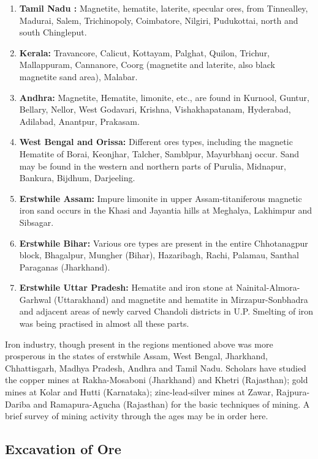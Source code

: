 \begin{enumerate}
\item {\bf Tamil Nadu :} Magnetite, hematite, laterite, specular ores, from Tinnealley, Madurai, Salem, Trichinopoly, Coimbatore, Nilgiri, Pudukottai, north and south Chingleput.
\item {\bf Kerala:} Travancore, Calicut, Kottayam, Palghat, Quilon, Trichur, Mallappuram, Cannanore, Coorg (magnetite and laterite, also black magnetite sand area), Malabar.
\item {\bf Andhra:} Magnetite, Hematite, limonite, etc., are found in Kurnool, Guntur, Bellary, Nellor, West Godavari, Krishna, Vishakhapatanam, Hyderabad, Adilabad, Anantpur, Prakasam.
\item {\bf West Bengal and Orissa:} Different ores types, including the magnetic Hematite of Borai, Keonjhar, Talcher, Samblpur, Mayurbhanj occur. Sand may be found in the western and northern parts of Purulia, Midnapur, Bankura, Bijdhum, Darjeeling.
\item {\bf Erstwhile Assam:} Impure limonite in upper Assam-titaniferous magnetic iron sand occurs in the Khasi and Jayantia hills at Meghalya, Lakhimpur and Sibsagar.
\item {\bf Erstwhile Bihar:} Various ore types are present in the entire Chhotanagpur block, Bhagalpur, Mungher (Bihar), Hazaribagh, Rachi, Palamau, Santhal Paraganas (Jharkhand).
\item {\bf Erstwhile Uttar Pradesh:} Hematite and iron stone at Nainital-Almora-Garhwal (Uttarakhand) and magnetite and hematite in Mirzapur-Sonbhadra and adjacent areas of newly carved Chandoli districts in U.P. Smelting of iron was being practised in almost all these parts.
\end{enumerate}

\vspace{-.2cm}

Iron industry, though present in the regions mentioned above was more prosperous in the states of erstwhile Assam, West Bengal, Jharkhand, Chhattisgarh, Madhya Pradesh, Andhra and Tamil Nadu. Scholars have studied the copper mines at Rakha-Mosaboni (Jharkhand) and Khetri (Rajasthan); gold mines at Kolar and Hutti (Karnataka); zinc-lead-silver mines at Zawar, Rajpura-Dariba and Ramapura-Agucha (Rajasthan) for the basic techniques of mining. A brief survey of mining activity through the ages may be in order here.  

\vspace{-.3cm}

\subsection*{Excavation of Ore}

